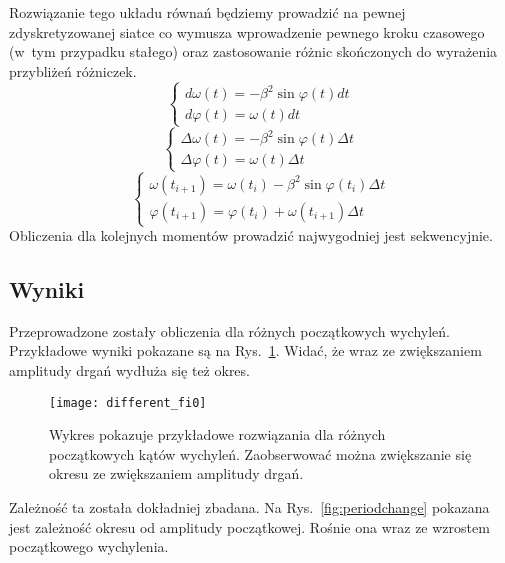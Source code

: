 \documentclass[a4paper; 12pt]{article}
\begin{document}
Rozwiązanie tego układu równań będziemy prowadzić na pewnej zdyskretyzowanej
siatce co wymusza wprowadzenie pewnego kroku czasowego (w~tym przypadku stałego) oraz zastosowanie różnic
skończonych do wyrażenia przybliżeń różniczek.
\begin{equation}
    \begin{cases}
        d\omega(t) = - \beta^2 \sin{\varphi(t)} dt \\
        d\varphi(t) = \omega(t) dt
    \end{cases}
\end{equation}
\begin{equation}
    \begin{cases}
        \Delta\omega(t) = - \beta^2 \sin{\varphi(t)} \Delta t \\
        \Delta\varphi(t) = \omega(t) \Delta t
    \end{cases}
\end{equation}
\begin{equation}
    \begin{cases}
        \omega(t_{i+1}) = \omega(t_{i}) - \beta^2 \sin{\varphi(t_i)} \Delta t \\
        \varphi(t_{i+1}) = \varphi(t_i) + \omega(t_{i+1}) \Delta t
    \end{cases}
\end{equation}
Obliczenia dla kolejnych momentów prowadzić najwygodniej jest sekwencyjnie.

\subsection{Wyniki}

Przeprowadzone zostały obliczenia dla różnych początkowych wychyleń.
Przykładowe wyniki pokazane są na Rys.~\ref{fig:differentfi0}.
Widać, że wraz ze zwiększaniem amplitudy drgań wydłuża się też okres.

\begin{figure}[h]
    \centering
    \texttt{[image: different\_fi0]}
    \caption{Wykres pokazuje przykładowe rozwiązania dla różnych początkowych
        kątów wychyleń.
        Zaobserwować można zwiększanie się okresu ze zwiększaniem amplitudy drgań.}
    \label{fig:differentfi0}
\end{figure}

Zależność ta została dokładniej zbadana.
Na Rys.~\ref{fig:periodchange} pokazana jest zależność okresu od amplitudy
początkowej.
Rośnie ona wraz ze wzrostem początkowego wychylenia.
\end{document}
